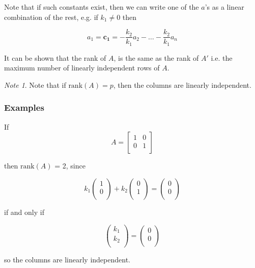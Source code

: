 \documentclass[12pt,a4paper]{article}
\theoremstyle{regla}
\theoremstyle{remark}
\newtheorem{notes}{Note}[section]
\theoremstyle{definition}
\theoremstyle{nonumberbreak}
\begin{document}
Note that if such constants exist, then we can write one of the $a$'s as a linear combination of the rest, e.g. if $k_1 \neq 0$ then

$$ a_1=\mathbf{c_1} =  -\frac{k_2}{k_1} a_2 - \ldots - \frac{k_2}{k_1} a_n $$

It can be shown that the rank of  $A$, is the same as the rank of  $A'$ i.e. the maximum number of linearly independent rows of  $A$. 
\begin{notes}
Note that if $\text{rank}(A) = p$, then the columns are linearly independent.
\end{notes}

\subsubsection{Examples}
\begin{xmpl}

If \[A= 
  \left[ 
   \begin{array}{cc}
     1 & 0 \\
     0 & 1 \\
   \end{array}
  \right]\]

then  $\text{rank}(A)$ = 2, since

 \[  k_1
  \left(
   \begin{array}{cc}
     1 \\
     0 \\
   \end{array}
  \right) +  k_2
  \left(
   \begin{array}{cc}
     0 \\
     1 \\
   \end{array}
  \right) =  \left(
    \begin{array}{cc}
      0 \\
      0 \\
    \end{array}
   \right) \]

if and only if  

 \[ \left( 
  \begin{array}{cc}
     k_1 \\
     k_2 \\
   \end{array}
  \right) =   \left(
    \begin{array}{cc}
      0 \\
      0 \\
    \end{array}
   \right) \]

so the columns are linearly independent.
\end{xmpl}
\end{document}
